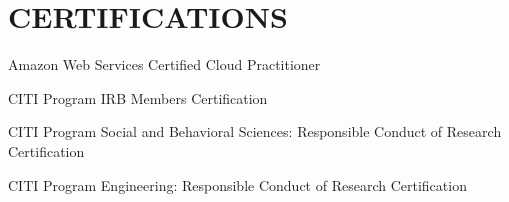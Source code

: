 \documentclass{article}
\newcommand{\listitemspace}{0.25em}
\renewenvironment{itemize}
{\begin{list}{}{\setlength{\leftmargin}{0em}
                \setlength{\parskip}{0em}
                \setlength{\itemsep}{\listitemspace}
                \setlength{\parsep}{\listitemspace}}}
{\end{list}}
\begin{document}
\section*{\normalsize{CERTIFICATIONS}}
\begin{itemize}
    \item Amazon Web Services Certified Cloud Practitioner
    \item CITI Program IRB Members Certification
    \item CITI Program Social and Behavioral Sciences: Responsible Conduct of Research Certification
    \item CITI Program Engineering: Responsible Conduct of Research Certification
\end{itemize}
\end{document}
